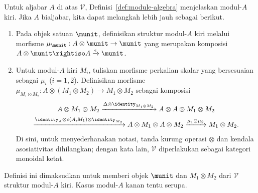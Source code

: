 Untuk aljabar $A$ di atas $\mathcal{V}$,
Definisi~\ref{def:module-algebra} menjelaskan modul-$A$ kiri. Jika $A$
bialjabar, kita dapat melangkah lebih jauh sebagai berikut.
\begin{enumerate}
	\item Pada objek satuan $\munit$, definisikan struktur modul-$A$ kiri
	melalui morfisme $\mu_{\munit}:A\otimes\munit\to\munit$ yang merupakan
	komposisi
	$A\otimes\munit\rightiso A\xrightarrow{\epsilon}\munit$.
	\item Untuk modul-$A$ kiri $M_i$, tuliskan morfisme perkalian skalar yang
	bersesuaian sebagai $\mu_i$ ($i=1,2$). Definisikan morfisme
	$\mu_{M_1\otimes M_2}:A\otimes(M_1\otimes M_2)\to M_1\otimes M_2$ sebagai
	komposisi
	\begin{multline*}
		A \otimes M_1 \otimes M_2 \xrightarrow{\Delta \otimes \identity_{M_1 \otimes M_2}} A \otimes A \otimes M_1 \otimes M_2 \\
		\xrightarrow{\identity_A \otimes c(A, M_1) \otimes \identity_{M_2}} A \otimes M_1 \otimes A \otimes M_2 \xrightarrow{\mu_1 \otimes \mu_2} M_1 \otimes M_2.
	\end{multline*}
	Di sini, untuk menyederhanakan notasi, tanda kurung operasi $\otimes$ dan
	kendala asosiativitas dihilangkan; dengan kata lain, $\mathcal{V}$
	diperlakukan sebagai kategori monoidal ketat.
\end{enumerate}

Definisi ini dimaksudkan untuk memberi objek $\munit$ dan
$M_1\otimes M_2$ dari $\mathcal{V}$ struktur modul-$A$ kiri. Kasus modul-$A$
kanan tentu serupa.

